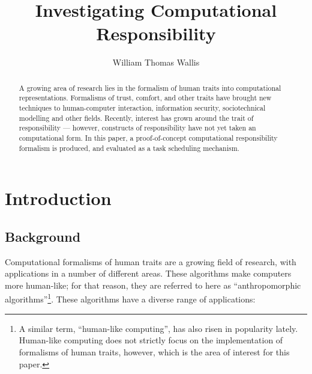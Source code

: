 



\title{Investigating Computational Responsibility}
\author{William Thomas Wallis}

\maketitle

\begin{abstract}

A growing area of research lies in the formalism of human traits into computational representations. Formalisms of trust, comfort, and other traits have brought new techniques to human-computer interaction, information security, sociotechnical modelling and other fields. Recently, interest has grown around the trait of responsibility --- however, constructs of responsibility have not yet taken an computational form. In this paper, a proof-of-concept computational responsibility formalism is produced, and evaluated as a task scheduling mechanism.
\end{abstract}

\section{Introduction}


\subsection{Background}

Computational formalisms of human traits are a growing field of research, with applications in a number of different areas. These algorithms make computers more human-like; for that reason, they are referred to here as ``anthropomorphic algorithms''\footnote{A similar term, ``human-like computing'', has also risen in popularity lately. Human-like computing does not strictly focus on the implementation of formalisms of human traits, however, which is the area of interest for this paper.}. These algorithms have a diverse range of applications:

